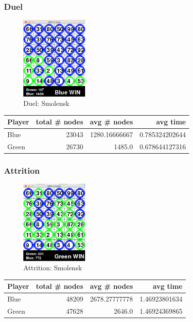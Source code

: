 \subsubsection*{Duel}
\begin{figure}[H]
\centering
\includegraphics[width=0.3\textwidth]{graphics/duel_smolensk2.png}
\caption{Duel: Smolensk}
\end{figure}
\begin{tabular}{l|r|r|r}
  Player & total \# nodes & avg \# nodes & avg time \\
  \hline
  Blue & 23043 & 1280.16666667 & 0.785324202644 \\
  Green & 26730 & 1485.0 & 0.678644127316 \\
\end{tabular}

\subsubsection*{Attrition}
\begin{figure}[H]
\centering
\includegraphics[width=0.3\textwidth]{graphics/attrition_smolensk2.png}
\caption{Attrition: Smolensk}
\end{figure}
\begin{tabular}{l|r|r|r}
  Player & total \# nodes & avg \# nodes & avg time \\
  \hline
  Blue & 48209 & 2678.27777778 & 1.46923801634 \\
  Green & 47628 & 2646.0 & 1.46924369865 \\
\end{tabular}

